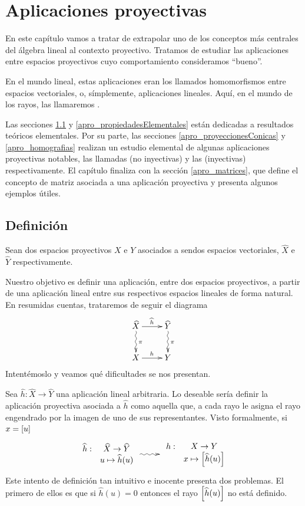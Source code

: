 \chapter{Aplicaciones proyectivas}
\label{apro}
En este capítulo vamos a tratar de extrapolar uno de los conceptos más centrales del álgebra lineal al contexto proyectivo. Tratamos de estudiar las aplicaciones entre espacios proyectivos cuyo comportamiento consideramos ``bueno''.

En el mundo lineal, estas aplicaciones eran los llamados homomorfismos entre espacios vectoriales, o, símplemente, aplicaciones lineales. Aquí, en el mundo de los rayos, las llamaremos .

Las secciones \ref{apro_definicion} y \ref{apro_propiedadesElementales} están dedicadas a resultados teóricos elementales. Por su parte, las secciones \ref{apro_proyeccionesConicas} y \ref{apro_homografias} realizan un estudio elemental de algunas aplicaciones proyectivas notables, las llamadas  (no inyectivas) y las  (inyectivas) respectivamente. El capítulo finaliza con la sección \ref{apro_matrices}, que define el concepto de matriz asociada a una aplicación proyectiva y presenta algunos ejemplos útiles.
\section{Definición}
\label{apro_definicion}
Sean dos espacios proyectivos $X$ e $Y$ asociados a sendos espacios vectoriales, $\widehat{X}$ e $\widehat{Y}$ respectivamente.

Nuestro objetivo es definir una aplicación, entre dos espacios proyectivos, a partir de una aplicación lineal entre sus respectivos espacios lineales de forma natural. En resumidas cuentas, trataremos de seguir el diagrama
\begin{equation*}
	\xymatrix{
		\widehat{X} \ar[r]^{\widehat{h}} \ar@{~>}[d]^{\pi}& \widehat{Y} \ar@{~>}[d]^{\pi}\\
		X \ar[r]^{h}& Y
	}
\end{equation*}
Intentémoslo y veamos qué dificultades se nos presentan.

Sea $\widehat{h}:\widehat{X}\to\widehat{Y}$ una aplicación lineal arbitraria. Lo deseable sería definir la aplicación proyectiva asociada a $\widehat{h}$ como aquella que, a cada rayo le asigna el rayo engendrado por la imagen de uno de sus representantes. Visto formalmente, si $x=\left [ u \right ]$
\begin{equation*}
	\xymatrix{
		{
			\begin{array}{rc}
			\widehat{h}:&\widehat{X}\to\widehat{Y}\\
			&u\mapsto\widehat{h}(u)
			\end{array}
		}
		\ar@{~>}[r]&
		{
			\begin{array}{rc}
			h: & X\to Y\\
			& x\mapsto\class{\widehat{h}(u)}
			\end{array}
		}
	}
\end{equation*}
Este intento de definición tan intuitivo e inocente presenta dos problemas. El primero de ellos es que si $\widehat{h}(u)=0$ entonces el rayo $\left [ \widehat{h}(u) \right ]$ no está definido.

